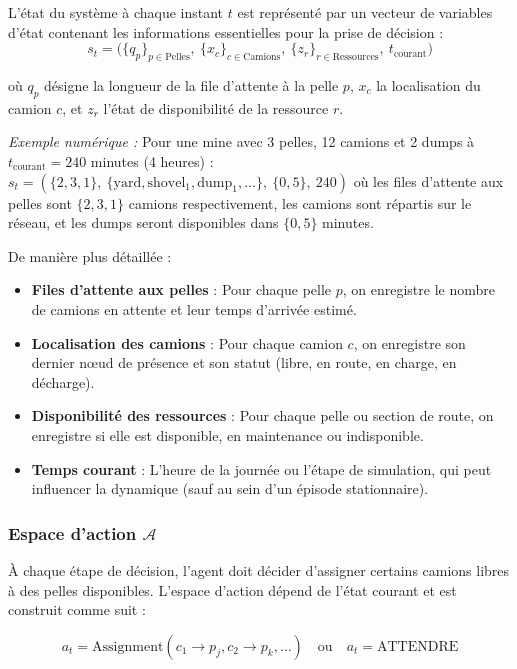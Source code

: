\documentclass[11pt,a4paper]{report}
\begin{document}
L'état du système à chaque instant $t$ est représenté par un vecteur de variables d'état contenant les informations essentielles pour la prise de décision :
\begin{equation}
    s_t = \Big( \{q_p\}_{p \in \text{Pelles}},\ \{x_c\}_{c \in \text{Camions}},\ \{z_r\}_{r \in \text{Ressources}},\ t_{\text{courant}} \Big)
\end{equation}

où $q_p$ désigne la longueur de la file d'attente à la pelle $p$, $x_c$ la localisation du camion $c$, et $z_r$ l'état de disponibilité de la ressource $r$.

\textit{Exemple numérique :} Pour une mine avec 3 pelles, 12 camions et 2 dumps à $t_{\text{courant}} = 240$ minutes (4 heures) : $s_t = (\{2{,}3,1\},\ \{\text{yard},\text{shovel}_1,\text{dump}_1,\ldots\},\ \{0{,}5\},\ 240)$ où les files d'attente aux pelles sont $\{2,3,1\}$ camions respectivement, les camions sont répartis sur le réseau, et les dumps seront disponibles dans $\{0,5\}$ minutes.

De manière plus détaillée :

\begin{itemize}
    \item \textbf{Files d'attente aux pelles} : Pour chaque pelle $p$, on enregistre le nombre de camions en attente et leur temps d'arrivée estimé.
    \item \textbf{Localisation des camions} : Pour chaque camion $c$, on enregistre son dernier nœud de présence et son statut (libre, en route, en charge, en décharge).
    \item \textbf{Disponibilité des ressources} : Pour chaque pelle ou section de route, on enregistre si elle est disponible, en maintenance ou indisponible.
    \item \textbf{Temps courant} : L'heure de la journée ou l'étape de simulation, qui peut influencer la dynamique (sauf au sein d'un épisode stationnaire).
\end{itemize}

\subsubsection*{Espace d'action $\mathcal{A}$}

À chaque étape de décision, l'agent doit décider d'assigner certains camions libres à des pelles disponibles. L'espace d'action dépend de l'état courant et est construit comme suit :

\begin{equation}
    a_t = \text{Assignment}(c_1 \rightarrow p_j, c_2 \rightarrow p_k, \ldots) \quad \text{ou} \quad a_t = \text{ATTENDRE}
\end{equation}
\end{document}
